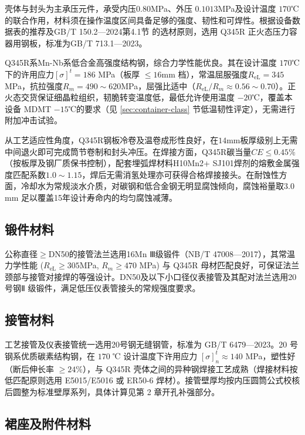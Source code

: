 壳体与封头为主承压元件，承受内压$0.80$MPa、外压 $0.1013$MPa及设计温度 $170$℃ 的联合作用，材料须在操作温度区间具备足够的强度、韧性和可焊性。根据设备数据表的推荐及GB/T 150.2—2024第4.1节\cite{gbt150-2024} 的选材原则，选用 Q345R 正火态压力容器用钢板，标准为GB/T 713.1—2023\cite{gbt713-1-2023}。

Q345R系Mn-Nb系低合金高强度结构钢，综合力学性能优良。其在设计温度 $170$℃下的许用应力$[\sigma]^t = 186$ MPa（板厚 $\le 16$mm 档），常温屈服强度$R_{\text{eL}} = 345$MPa，抗拉强度$R_m = 490 \sim 620$MPa，屈强比适中（$R_{\text{eL}}/R_m \approx 0.56 \sim 0.70$）。正火态交货保证细晶粒组织，韧脆转变温度低，最低允许使用温度 $-20$℃，覆盖本设备 MDMT $-15$℃的要求（见 \ref{sec:container-class} 节低温韧性评定），无需进行附加冲击试验\cite{hgt20585-2020}。

从工艺适应性角度，Q345R钢板冷卷及温卷成形性良好，在$14$mm板厚级别上无需中间退火即可完成筒节卷制和封头冲压。在焊接方面，Q345R碳当量$CE\le0.45\%$（按板厚及钢厂质保书控制），配套埋弧焊材料H10Mn2+ SJ101焊剂的熔敷金属强度匹配系数$1.0 \sim 1.15$，焊后无需消氢处理亦可获得合格焊接接头\cite{hgt20584-2020}。在耐蚀性方面，冷却水为常规淡水介质，对碳钢和低合金钢无明显腐蚀倾向，腐蚀裕量取$3.0$mm 足以覆盖15年设计寿命内的均匀腐蚀减薄。

\subsection{锻件材料}

公称直径$\ge$DN50的接管法兰选用16Mn Ⅲ级锻件（NB/T 47008—2017），其常温力学性能 ($R_{\text{eL}}\ge305$MPa, $R_m\ge 470$ MPa) 与 Q345R 母材匹配良好，可保证法兰颈部与接管对接焊的等强设计。DN50及以下小口径仪表接管及其配对法兰选用20号钢Ⅱ 级锻件，满足低压仪表管接头的常规强度要求。

\subsection{接管材料}

工艺接管及仪表接管统一选用20号钢无缝钢管，标准为 GB/T 6479—2023。20 号钢系优质碳素结构钢，在 $170$ ℃ 设计温度下许用应力 $[\sigma]^t_n \approx 140$ MPa，塑性好（断后伸长率 $\ge 24\%$），与 Q345R 壳体之间的异种钢焊接工艺成熟（焊接材料按低匹配原则选用 E5015/E5016 或 ER50-6 焊材）。接管壁厚均按内压圆筒公式校核后圆整为标准壁厚系列，具体计算见第 2 章开孔补强部分。

\subsection{裙座及附件材料}

